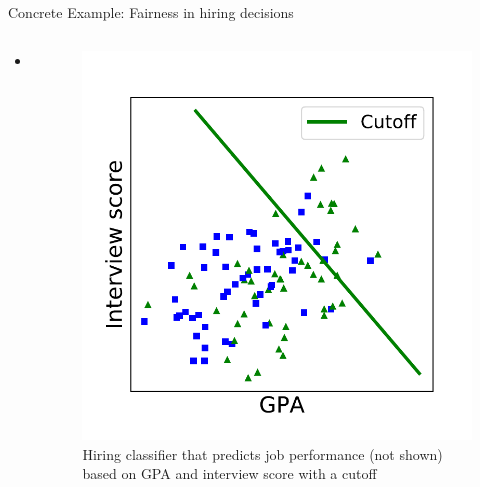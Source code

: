 \begin{frame}{Concrete Example: Fairness in hiring decisions \cite{barocas-hardt-narayanan}}
\begin{columns}
\begin{column}{0.5\textwidth}
   \begin{itemize}
       \item 
   \end{itemize}
\end{column}
\begin{column}{0.5\textwidth}  %
    \begin{figure}
        \centering
        \includegraphics[width=.70\textwidth]{presentation/assets/toy_example.pdf}
        \caption{Hiring classifier that predicts job performance (not shown) based on GPA and interview score with a cutoff \cite{barocas-hardt-narayanan}}
        \label{fig:my_label}
    \end{figure}
\end{column}
\end{columns}
\end{frame}